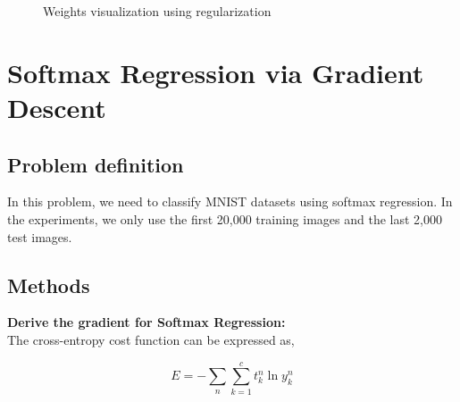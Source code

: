 \documentclass{article} %
\begin{document}
\begin{figure}
	\qquad
	\caption{Weights visualization using regularization}%
	\label{fig:P10}%
\end{figure}

\section{Softmax Regression via Gradient Descent}
\subsection{Problem definition}
In this problem, we need to classify MNIST datasets using softmax regression. In the experiments, we only use the first 20,000 training images and the last 2,000 test images.

\subsection{Methods}
\textbf{Derive the gradient for Softmax Regression:} \\
The cross-entropy cost function can be expressed as,

\begin{equation}
	E = - \sum_{n}\sum_{k=1}^{c}t_k^n\ln y_k^n
\end{equation}
\end{document}
